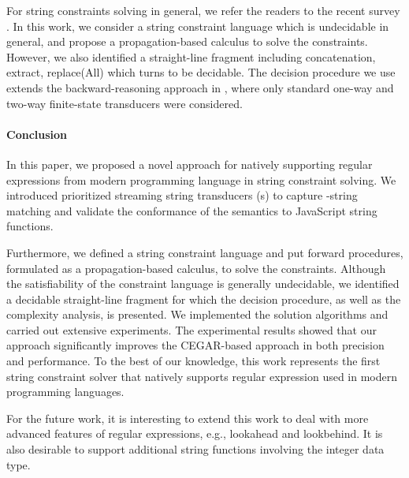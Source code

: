 For string constraints solving in general, we refer the readers to the recent survey \cite{Ama20}. In this work, we consider a string constraint language which is undecidable in general, and propose a propagation-based calculus to solve the constraints. However, we also identified a straight-line fragment including concatenation, extract, replace(All) which turns to be decidable. The decision procedure we use extends the backward-reasoning approach in \cite{CHL+19}, where only standard one-way and two-way finite-state transducers were considered. 

 


\paragraph{Conclusion}
In this paper, we proposed a novel approach for natively supporting regular expressions from modern programming language in string constraint solving. We introduced prioritized streaming string transducers ({\PSST}s) to capture \regexp-string matching and validate the conformance of the semantics to JavaScript string functions.   

Furthermore, we defined a string constraint language and put forward procedures, formulated as a propagation-based calculus, to solve the constraints. Although the satisfiability of the constraint language is generally undecidable, we identified a decidable straight-line fragment for which the decision procedure, as well as the complexity analysis, is presented.  
%
We implemented the solution algorithms and carried out extensive experiments. The experimental results showed that our approach significantly improves the CEGAR-based approach in both precision and performance. To the best of our knowledge, this work represents the first string constraint solver that natively supports regular expression used in modern programming languages. 

For the future work, it is interesting to extend this work to deal with more advanced features of regular expressions, e.g., lookahead and lookbehind. It is also desirable to support additional string functions involving the integer data type. %
